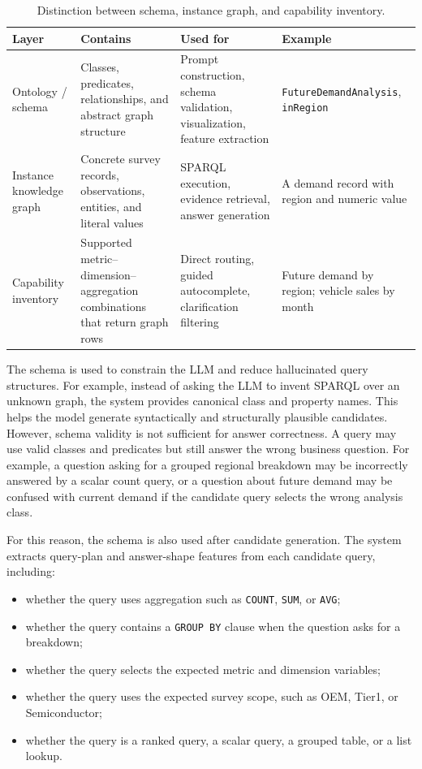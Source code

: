 \begin{table}[ht]
\centering
\caption{Distinction between schema, instance graph, and capability inventory.}
\label{tab:kg-schema-capability-layers}
\begin{tabular}{p{3.0cm}p{4.5cm}p{4.5cm}p{2.8cm}}
\hline
\textbf{Layer} & \textbf{Contains} & \textbf{Used for} & \textbf{Example} \\
\hline
Ontology / schema & Classes, predicates, relationships, and abstract graph structure & Prompt construction, schema validation, visualization, feature extraction & \texttt{FutureDemandAnalysis}, \texttt{inRegion} \\
Instance knowledge graph & Concrete survey records, observations, entities, and literal values & SPARQL execution, evidence retrieval, answer generation & A demand record with region and numeric value \\
Capability inventory & Supported metric--dimension--aggregation combinations that return graph rows & Direct routing, guided autocomplete, clarification filtering & Future demand by region; vehicle sales by month \\
\hline
\end{tabular}
\end{table}

The schema is used to constrain the LLM and reduce hallucinated query structures. For example, instead of asking the LLM to invent SPARQL over an unknown graph, the system provides canonical class and property names. This helps the model generate syntactically and structurally plausible candidates. However, schema validity is not sufficient for answer correctness. A query may use valid classes and predicates but still answer the wrong business question. For example, a question asking for a grouped regional breakdown may be incorrectly answered by a scalar count query, or a question about future demand may be confused with current demand if the candidate query selects the wrong analysis class.

For this reason, the schema is also used after candidate generation. The system extracts query-plan and answer-shape features from each candidate query, including:

\begin{itemize}
    \item whether the query uses aggregation such as \texttt{COUNT}, \texttt{SUM}, or \texttt{AVG};
    \item whether the query contains a \texttt{GROUP BY} clause when the question asks for a breakdown;
    \item whether the query selects the expected metric and dimension variables;
    \item whether the query uses the expected survey scope, such as OEM, Tier1, or Semiconductor;
    \item whether the query is a ranked query, a scalar query, a grouped table, or a list lookup.
\end{itemize}

